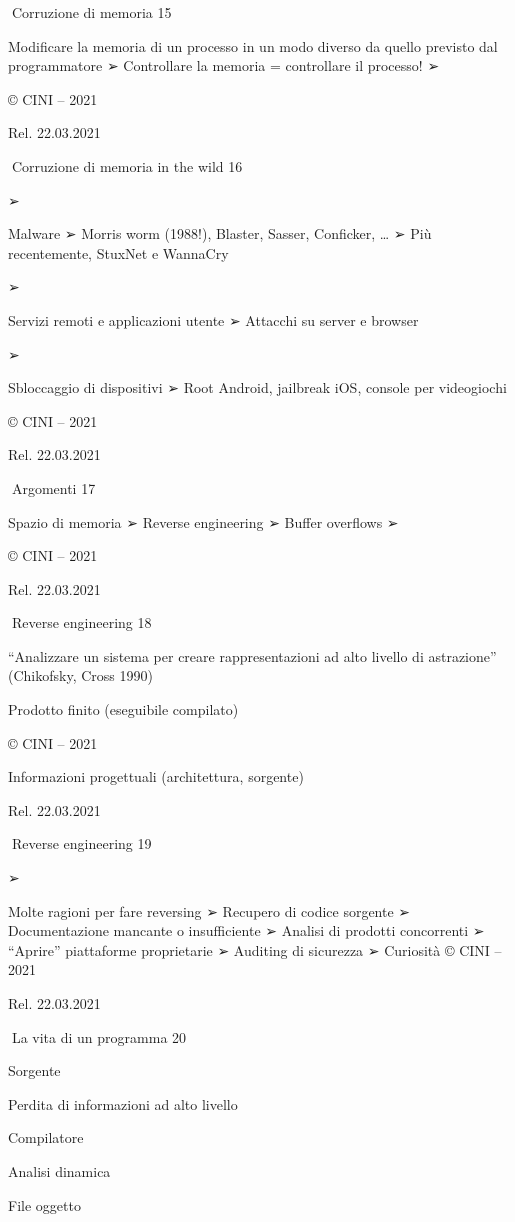 \documentclass[11pt,a4paper]{article}
\begin{document}
Corruzione di memoria 15

Modificare la memoria di un processo in un modo diverso da quello
previsto dal programmatore ➢ Controllare la memoria = controllare il
processo! ➢

© CINI -- 2021

Rel. 22.03.2021

Corruzione di memoria in the wild 16

➢

Malware ➢ Morris worm (1988!), Blaster, Sasser, Conficker, \ldots{} ➢
Più recentemente, StuxNet e WannaCry

➢

Servizi remoti e applicazioni utente ➢ Attacchi su server e browser

➢

Sbloccaggio di dispositivi ➢ Root Android, jailbreak iOS, console per
videogiochi

© CINI -- 2021

Rel. 22.03.2021

Argomenti 17

Spazio di memoria ➢ Reverse engineering ➢ Buffer overflows ➢

© CINI -- 2021

Rel. 22.03.2021

Reverse engineering 18

``Analizzare un sistema per creare rappresentazioni ad alto livello di
astrazione'' (Chikofsky, Cross 1990)

Prodotto finito (eseguibile compilato)

© CINI -- 2021

Informazioni progettuali (architettura, sorgente)

Rel. 22.03.2021

Reverse engineering 19

➢

Molte ragioni per fare reversing ➢ Recupero di codice sorgente ➢
Documentazione mancante o insufficiente ➢ Analisi di prodotti
concorrenti ➢ ``Aprire'' piattaforme proprietarie ➢ Auditing di
sicurezza ➢ Curiosità © CINI -- 2021

Rel. 22.03.2021

La vita di un programma 20

Sorgente

Perdita di informazioni ad alto livello

Compilatore

Analisi dinamica

File oggetto
\end{document}
